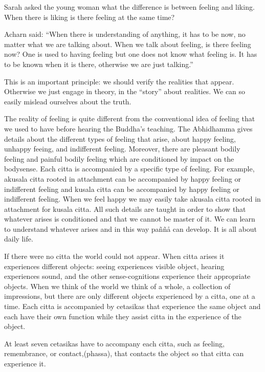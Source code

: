 \documentclass[10pt,a4paper,final]{article}
\begin{document}
Sarah asked the young woman what the difference is between
feeling and liking. When there is liking is there feeling at the same
time?

Acharn said: ``When there is understanding of anything, it
has to be now, no matter what we are talking about. When we talk about
feeling, is there feeling now? One is used to having feeling but one
does not know what feeling is. It has to be known when it is there,
otherwise we are just talking.'' 

This is an important principle: we should verify the
realities that appear. Otherwise we just engage in theory, in the
``story'' about realities. We can so easily mislead ourselves about the
truth. 

The reality of feeling is quite different
from the conventional idea of feeling that we used to have before
hearing the Buddha's teaching. The
Abhidhamma gives details about the different types of
feeling that arise,
about happy feeling, unhappy feeing, and indifferent
feeling. Moreover, there are pleasant bodily feeling and painful bodily
feeling which are conditioned by impact on the bodysense. Each citta is
accompanied by a specific type of feeling. For example, akusala citta
rooted in attachment can be accompanied by happy feeling or indifferent
feeling and kusala citta can be accompanied by happy feeling or
indifferent feeling. When we feel
happy we may easily take akusala citta rooted in attachment
for kusala citta. All such details are taught in order to show that
whatever arises is conditioned and that
we cannot be master of it. We can learn to understand whatever arises
and in this way paññå can
develop. It is all about daily life. 

If there were no citta the world could not
appear. When citta arises it experiences different objects: seeing
experiences visible object, hearing experiences sound, and the other
sense-cognitions experience their appropriate objects. When we think of
the world we think of a whole, a collection of impressions, but there
are only different objects experienced by a citta, one at a time. Each
citta is accompanied by cetasikas that experience the same object and
each have their own function while they assist citta in the experience
of the object. 

At least seven cetasikas have to accompany
each citta, such as feeling, remembrance, or contact,(phassa), that
contacts the object so that citta can experience it. 
\end{document}
